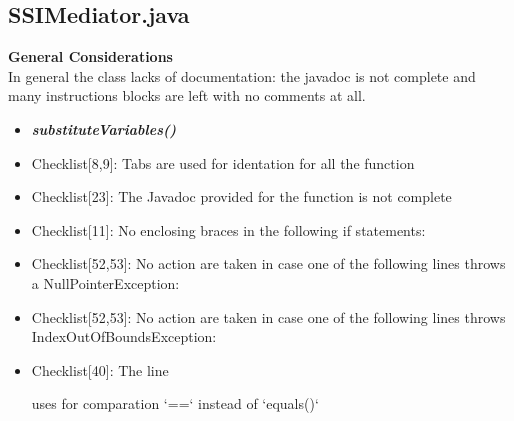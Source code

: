 \documentclass[11pt,titlepage]{article} %
\begin{document}
\subsection{SSIMediator.java}
  \textbf{General Considerations} \hfill \\
  In general the class lacks of documentation: the javadoc is not complete and many instructions blocks are left with no comments at all.
  \begin{itemize}
   \item \textbf{\textit{substituteVariables()}}
   \item Checklist[8,9]: Tabs are used for identation for all the function
   \item Checklist[23]: The Javadoc provided for the function is not complete 
   \item Checklist[11]: No enclosing braces in the following if statements:
    
    
    
    


   \item Checklist[52,53]: No action are taken in case one of the following lines throws a NullPointerException:
    
    
    
    
   \item Checklist[52,53]: No action are taken in case one of the following lines throws IndexOutOfBoundsException:
    
    
    
    
    
    
    
    
    
   \item Checklist[40]: The line
    
    uses for comparation `==` instead of `equals()`
  \end{itemize}
\newpage
\end{document}
